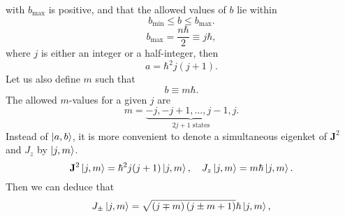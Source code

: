 \documentclass{article}
\theoremstyle{1}
\begin{document}
with $b_\mathrm{max}$ is positive, and that the allowed values of $b$ lie within
\begin{equation}
    b_\mathrm{min}\le b\le b_\mathrm{max}.
\end{equation}
\begin{equation}
    b_\mathrm{max}=\frac{n\hbar}{2}\equiv j\hbar,
\end{equation}
where $j$ is either an integer or a half-integer, then 
\begin{equation}
    a=\hbar^2 j(j+1).
\end{equation}
Let us also define $m$ such that 
\begin{equation}
    b\equiv m\hbar.
\end{equation}
The allowed $m$-values for a given $j$ are
\begin{equation}
    m=\underset{2j+1 \text{ states}}{\underbrace{-j,-j+1,\dots,j-1,j}}.
\end{equation}
Instead of $\ket{a,b}$, it is more convenient to denote a simultaneous eigenket of $\mathbf{J}^2$
and $J_z$ by $\ket{j,m}$.
\begin{equation}
    \mathbf{J}^2\ket{j,m}=\hbar^2 j(j+1)\ket{j,m},\quad J_z\ket{j,m}=m\hbar\ket{j,m}.
\end{equation}
Then we can deduce that 
\begin{equation}
    J_\pm\ket{j,m}=\sqrt{\left(j\mp m\right)\left(j\pm m+1\right)}\hbar\ket{j,m},
\end{equation}
\end{document}
